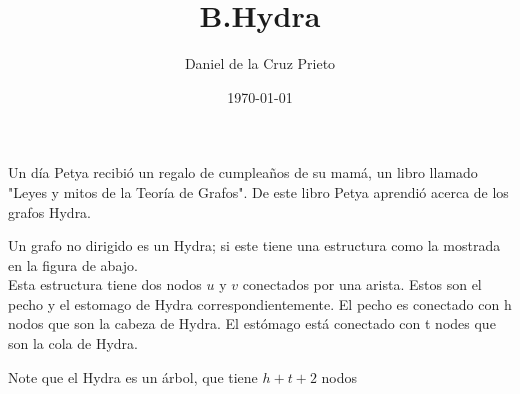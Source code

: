 \documentclass[12pt]{article}
\begin{document}
    \title{B.Hydra} 
    \author{Daniel de la Cruz Prieto} 
    \date{\today} 
    \maketitle

    \begin{flushleft}
    	Un d\'ia Petya recibi\'o un regalo de cumplea\~nos de su mam\'a, un libro llamado "Leyes y mitos de la Teor\'ia de Grafos". De este libro Petya aprendi\'o acerca de los grafos Hydra.
    \end{flushleft}
    
    \begin{flushleft}
        Un grafo no dirigido es un Hydra; si este tiene una estructura como la mostrada en la figura de abajo.\\
        Esta estructura tiene dos nodos $u$ y $v$ conectados por una arista. Estos son el pecho y el estomago de Hydra
        correspondientemente. El pecho es conectado con h nodos que son la cabeza de Hydra. El est\'omago est\'a conectado con t nodes que son la cola de Hydra.
    \end{flushleft}
      
    \begin{flushleft}
         Note que el Hydra es un \'arbol, que tiene $h+t+2$ nodos
    \end{flushleft}
    
\end{document}
